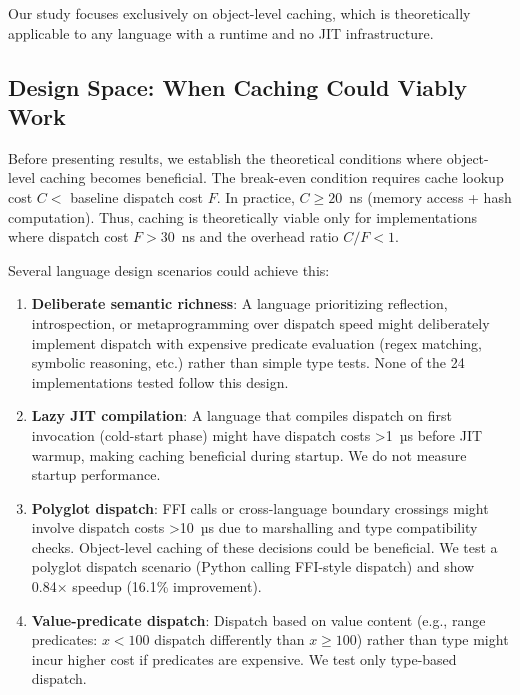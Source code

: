 \documentclass[sigplan,final,acmsmall,review,screen]{acmart}
\begin{document}
Our study focuses exclusively on object-level caching, which is theoretically applicable to any
language with a runtime and no JIT infrastructure.

\subsection{Design Space: When Caching Could Viably Work}

Before presenting results, we establish the theoretical conditions where object-level caching becomes beneficial.
The break-even condition requires cache lookup cost $C < $ baseline dispatch cost $F$. In practice, $C \geq 20$~ns (memory access + hash computation).
Thus, caching is theoretically viable only for implementations where dispatch cost $F > 30$~ns and the overhead ratio $C/F < 1$.

Several language design scenarios could achieve this:

\begin{enumerate}
  \item \textbf{Deliberate semantic richness}: A language prioritizing reflection, introspection, or metaprogramming over dispatch speed
    might deliberately implement dispatch with expensive predicate evaluation (regex matching, symbolic reasoning, etc.) rather than simple type tests.
    None of the 24 implementations tested follow this design.

  \item \textbf{Lazy JIT compilation}: A language that compiles dispatch on first invocation (cold-start phase) might have dispatch costs >1~µs
    before JIT warmup, making caching beneficial during startup. We do not measure startup performance.

  \item \textbf{Polyglot dispatch}: FFI calls or cross-language boundary crossings might involve dispatch costs >10~µs due to marshalling and
    type compatibility checks. Object-level caching of these decisions could be beneficial. We test a polyglot dispatch scenario (Python calling FFI-style dispatch) and show 0.84× speedup (16.1\% improvement).

  \item \textbf{Value-predicate dispatch}: Dispatch based on value content (e.g., range predicates: $x < 100$ dispatch differently than $x \geq 100$)
    rather than type might incur higher cost if predicates are expensive. We test only type-based dispatch.
\end{enumerate}
\end{document}
